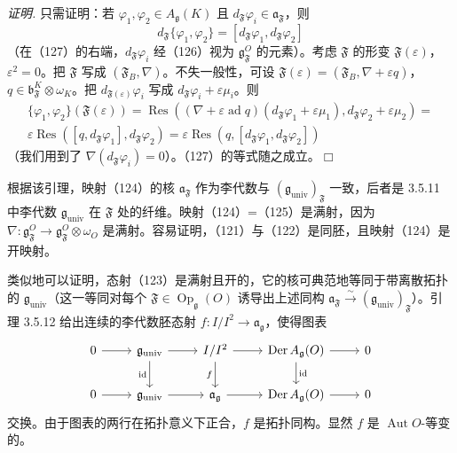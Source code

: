 \emph{证明.} 只需证明：若 $\varphi_1,\varphi_2\in A_{\mathfrak{g}}(K)$ 且 $d_{\mathfrak{F}}\varphi_i\in\mathfrak{a}_{\mathfrak{F}}$，则
\begin{equation}\tag{127}
d_{\mathfrak{F}}\{\varphi_1,\varphi_2\}=[d_{\mathfrak{F}}\varphi_1,d_{\mathfrak{F}}\varphi_2]
\end{equation}
（在（127）的右端，$d_{\mathfrak{F}}\varphi_i$ 经（126）视为 $\mathfrak{g}^O_{\mathfrak{F}}$ 的元素）。考虑 $\mathfrak{F}$ 的形变 $\mathfrak{F}(\varepsilon)$，$\varepsilon^2=0$。把 $\mathfrak{F}$ 写成 $(\mathfrak{F}_B,\nabla)$。不失一般性，可设 $\mathfrak{F}(\varepsilon)=(\mathfrak{F}_B,\nabla+\varepsilon q)$，$q\in\mathfrak{b}^K_{\mathfrak{F}}\otimes\omega_K$。把 $d_{\mathfrak{F}(\varepsilon)}\varphi_i$ 写成 $d_{\mathfrak{F}}\varphi_i+\varepsilon\mu_i$。则
\[
\begin{gathered}
\{\varphi_1,\varphi_2\}(\mathfrak{F}(\varepsilon))=\operatorname{Res}((\nabla+\varepsilon\operatorname{ad}q)(d_{\mathfrak{F}}\varphi_1+\varepsilon\mu_1),d_{\mathfrak{F}}\varphi_2+\varepsilon\mu_2)=\\
\varepsilon\operatorname{Res}([q,d_{\mathfrak{F}}\varphi_1],d_{\mathfrak{F}}\varphi_2)=\varepsilon\operatorname{Res}(q,[d_{\mathfrak{F}}\varphi_1,d_{\mathfrak{F}}\varphi_2])
\end{gathered}
\]
（我们用到了 $\nabla(d_{\mathfrak{F}}\varphi_i)=0$）。（127）的等式随之成立。\hfill$\Box$


根据该引理，映射（124）的核 $\mathfrak{a}_{\mathfrak{F}}$ 作为李代数与 $(\mathfrak{g}_{\mathrm{univ}})_{\mathfrak{F}}$ 一致，后者是 3.5.11 中李代数 $\mathfrak{g}_{\mathrm{univ}}$ 在 $\mathfrak{F}$ 处的纤维。映射（124）=（125）是满射，因为 $\nabla:\mathfrak{g}^{O}_{\mathfrak{F}}\to\mathfrak{g}^{O}_{\mathfrak{F}}\otimes\omega_{O}$ 是满射。容易证明，（121）与（122）是同胚，且映射（124）是开映射。

类似地可以证明，态射（123）是满射且开的，它的核可典范地等同于带离散拓扑的 $\mathfrak{g}_{\mathrm{univ}}$（这一等同对每个 $\mathfrak{F}\in\operatorname{Op}_{\mathfrak{g}}(O)$ 诱导出上述同构 $\mathfrak{a}_{\mathfrak{F}}\xrightarrow{\sim}(\mathfrak{g}_{\mathrm{univ}})_{\mathfrak{F}}$）。引理 3.5.12 给出连续的李代数胚态射 $f:I/I^{2}\to\mathfrak{a}_{\mathfrak{g}}$，使得图表
\[
\begin{tikzcd}
  0 \arrow[r] & \mathfrak{g}_{\mathrm{univ}} \arrow[r] \arrow[d, "\mathrm{id}"'] & I/I^{2} \arrow[r] \arrow[d, "f"']
    & \operatorname{Der}A_{\mathfrak{g}}(O) \arrow[r] \arrow[d, "\mathrm{id}"] & 0 \\
  0 \arrow[r] & \mathfrak{g}_{\mathrm{univ}} \arrow[r] & \mathfrak{a}_{\mathfrak{g}} \arrow[r]
    & \operatorname{Der}A_{\mathfrak{g}}(O) \arrow[r] & 0
\end{tikzcd}
\]
交换。由于图表的两行在拓扑意义下正合，$f$ 是拓扑同构。显然 $f$ 是 $\operatorname{Aut}O$-等变的。

